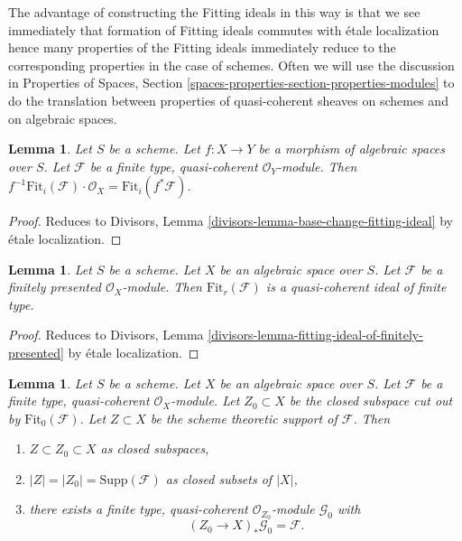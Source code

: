 \documentclass{stacks-project}
\theoremstyle{plain}
\newtheorem{lemma}[subsection]{Lemma}
\theoremstyle{definition}
\theoremstyle{remark}
\numberwithin{equation}{subsection}
\begin{document}
\medskip\noindent
The advantage of constructing the Fitting ideals in this way
is that we see immediately that formation of Fitting ideals
commutes with \'etale localization hence many properties of
the Fitting ideals immediately reduce to the corresponding
properties in the case of schemes. Often we will use the
discussion in Properties of Spaces, Section
\ref{spaces-properties-section-properties-modules}
to do the translation between properties of quasi-coherent sheaves
on schemes and on algebraic spaces.

\begin{lemma}
\label{lemma-base-change-fitting-ideal}
Let $S$ be a scheme.
Let $f : X \to Y$ be a morphism of algebraic spaces over $S$.
Let $\mathcal{F}$ be a finite type, quasi-coherent $\mathcal{O}_Y$-module.
Then
$f^{-1}\text{Fit}_i(\mathcal{F}) \cdot \mathcal{O}_X =
\text{Fit}_i(f^*\mathcal{F})$.
\end{lemma}

\begin{proof}
Reduces to
Divisors, Lemma \ref{divisors-lemma-base-change-fitting-ideal}
by \'etale localization.
\end{proof}

\begin{lemma}
\label{lemma-fitting-ideal-of-finitely-presented}
Let $S$ be a scheme. Let $X$ be an algebraic space over $S$.
Let $\mathcal{F}$ be a finitely presented $\mathcal{O}_X$-module.
Then $\text{Fit}_r(\mathcal{F})$ is a quasi-coherent ideal of finite type.
\end{lemma}

\begin{proof}
Reduces to
Divisors, Lemma \ref{divisors-lemma-fitting-ideal-of-finitely-presented}
by \'etale localization.
\end{proof}

\begin{lemma}
\label{lemma-on-subscheme-cut-out-by-Fit-0}
Let $S$ be a scheme. Let $X$ be an algebraic space over $S$.
Let $\mathcal{F}$ be a finite type, quasi-coherent $\mathcal{O}_X$-module.
Let $Z_0 \subset X$ be the closed subspace cut out by
$\text{Fit}_0(\mathcal{F})$.
Let $Z \subset X$ be the scheme theoretic support of $\mathcal{F}$.
Then
\begin{enumerate}
\item $Z \subset Z_0 \subset X$ as closed subspaces,
\item $|Z| = |Z_0| = \text{Supp}(\mathcal{F})$ as closed subsets of $|X|$,
\item there exists a finite type, quasi-coherent $\mathcal{O}_{Z_0}$-module
$\mathcal{G}_0$ with
$$
(Z_0 \to X)_*\mathcal{G}_0 = \mathcal{F}.
$$
\end{enumerate}
\end{lemma}
\end{document}
